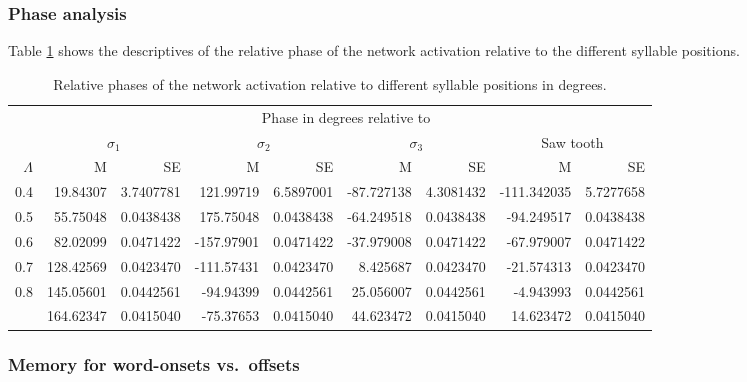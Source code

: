 \documentclass[
]{article}
\begin{document}
\hypertarget{phase-analysis-1}{%
\subsubsection{Phase analysis}\label{phase-analysis-1}}

Table \ref{tab:basic-experiment-global-phase-table2} shows the
descriptives of the relative phase of the network activation relative to
the different syllable positions.

\begin{table}

\caption{\label{tab:basic-experiment-global-phase-table2}Relative phases of the network activation relative to different syllable positions in degrees.}
\centering
\begin{tabular}[t]{rrrrrrrrr}
\toprule
\multicolumn{1}{c}{ } & \multicolumn{8}{c}{Phase in degrees relative to} \\
\cmidrule(l{3pt}r{3pt}){2-9}
\multicolumn{1}{c}{ } & \multicolumn{2}{c}{$\sigma_1$} & \multicolumn{2}{c}{$\sigma_2$} & \multicolumn{2}{c}{$\sigma_3$} & \multicolumn{2}{c}{Saw tooth} \\
\cmidrule(l{3pt}r{3pt}){2-3} \cmidrule(l{3pt}r{3pt}){4-5} \cmidrule(l{3pt}r{3pt}){6-7} \cmidrule(l{3pt}r{3pt}){8-9}
$\Lambda$ & M & SE & M & SE & M & SE & M & SE\\
\midrule
0.4 & 19.84307 & 3.7407781 & 121.99719 & 6.5897001 & -87.727138 & 4.3081432 & -111.342035 & 5.7277658\\
0.5 & 55.75048 & 0.0438438 & 175.75048 & 0.0438438 & -64.249518 & 0.0438438 & -94.249517 & 0.0438438\\
0.6 & 82.02099 & 0.0471422 & -157.97901 & 0.0471422 & -37.979008 & 0.0471422 & -67.979007 & 0.0471422\\
0.7 & 128.42569 & 0.0423470 & -111.57431 & 0.0423470 & 8.425687 & 0.0423470 & -21.574313 & 0.0423470\\
0.8 & 145.05601 & 0.0442561 & -94.94399 & 0.0442561 & 25.056007 & 0.0442561 & -4.943993 & 0.0442561\\
\addlinespace
0.9 & 164.62347 & 0.0415040 & -75.37653 & 0.0415040 & 44.623472 & 0.0415040 & 14.623472 & 0.0415040\\
\bottomrule
\end{tabular}
\end{table}

\clearpage

\hypertarget{memory-for-word-onsets-vs.-offsets}{%
\subsubsection{Memory for word-onsets
vs.~offsets}\label{memory-for-word-onsets-vs.-offsets}}
\end{document}

